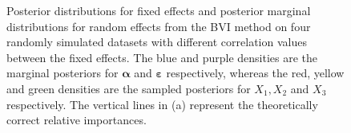 \begin{figure}[!ht]
  \centering
  \vspace{5mm}

  \caption{Posterior distributions for fixed effects and posterior marginal distributions for random effects from the BVI method on four randomly simulated datasets with different correlation values between the fixed effects. The blue and purple densities are the marginal posteriors for $\boldsymbol{\alpha}$ and $\boldsymbol{\varepsilon}$ respectively, whereas the red, yellow and green densities are the sampled posteriors for $X_1, X_2$ and $X_3$ respectively. The vertical lines in (a) represent the theoretically correct relative importances.}
  \label{fig:posterior_distributions}
\end{figure}
